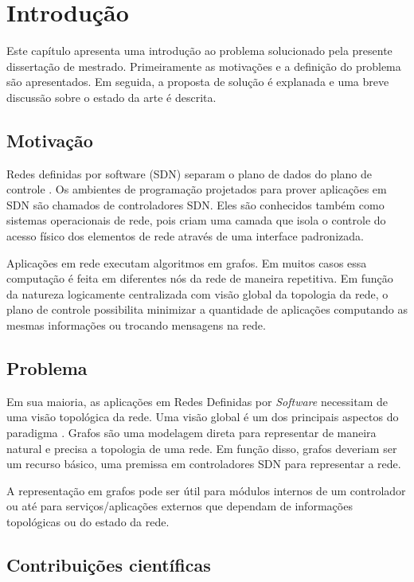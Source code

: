 \chapter{Introdução}
\label{chap:introduction}

Este capítulo apresenta uma introdução ao problema solucionado pela
presente dissertação de mestrado.
Primeiramente as motivações e a definição do problema são apresentados.
Em seguida, a proposta de solução é explanada e uma breve discussão sobre
o estado da arte é descrita.

\section{Motivação}

Redes definidas por software (SDN) separam o plano de dados do plano
de controle \citep{guedes2012redes}.
Os ambientes de programação projetados para prover aplicações em SDN são
chamados de controladores SDN.
Eles são conhecidos também como sistemas operacionais de rede, pois criam uma
camada que isola o controle do acesso físico dos elementos de rede através
de uma interface padronizada.

Aplicações em rede executam algoritmos em grafos.
Em muitos casos essa computação é feita em diferentes nós da rede de maneira
repetitiva.
Em função da natureza logicamente centralizada com visão global da topologia
da rede, o plano de controle possibilita minimizar a quantidade de aplicações
computando as mesmas informações ou trocando mensagens na rede.

\section{Problema}

Em sua maioria, as aplicações em Redes Definidas por \emph{Software} necessitam
de uma visão topológica da rede.
Uma visão global é um dos principais aspectos do paradigma
\citep{martin2010virtualizing}.
Grafos são uma modelagem direta para representar de maneira natural e precisa
a topologia de uma rede.
Em função disso, grafos deveriam ser um recurso básico, uma premissa em
controladores SDN para representar a rede.

A representação em grafos pode ser útil para módulos internos de um controlador
ou até para serviços/aplicações externos que dependam de informações
topológicas ou do estado da rede.

\section{Contribuições científicas}

